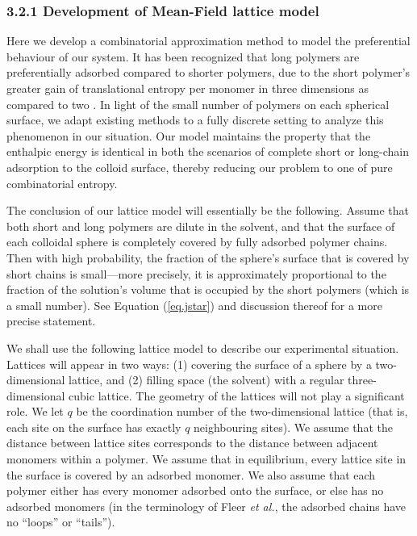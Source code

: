 \documentclass[journal=mamobx,manuscript=article]{achemso}
\begin{document}
\subsubsection{3.2.1 Development of Mean-Field lattice model}

Here we develop a combinatorial approximation method %
to model the preferential behaviour of our system.
It has been recognized that long polymers are
preferentially adsorbed compared to shorter polymers,
due to the short polymer's greater gain of
translational entropy per monomer in three dimensions
as compared to two 
\cite{Fleer1993}.  
In light of the small number of polymers on each
spherical surface, we adapt existing methods to a
fully discrete setting to analyze this phenomenon in our
situation.  Our model maintains the property that the enthalpic energy is identical in both the scenarios of complete short or long-chain adsorption to the colloid surface, thereby reducing our problem
to one of pure combinatorial entropy. 

The conclusion of our lattice model will essentially
be the following. 
Assume that both short and long polymers 
are dilute in the solvent, and that the 
surface of each colloidal sphere is completely covered 
by fully adsorbed polymer chains.  Then with high probability, 
the fraction of the sphere's surface that is 
covered by short chains is small---more precisely, it 
is approximately proportional
to the fraction of the solution's volume that is
occupied by the short polymers (which is a small
number).  See  Equation (\ref{eq.jstar}) and discussion thereof for a more precise statement.


We shall use the following lattice model to describe our experimental situation.  
Lattices will appear in two ways:  (1) covering the surface of a sphere by a two-dimensional lattice, and
(2) filling space (the solvent) with a regular three-dimensional cubic lattice.  
The geometry of the lattices will not play a significant role.  
We let $q$ be the coordination number of the two-dimensional lattice 
(that is, each site on the surface has exactly $q$ neighbouring sites).  We assume that 
the distance between lattice sites corresponds to the distance between adjacent monomers within a polymer.  
We assume that in equilibrium, every lattice site in the surface is covered by an adsorbed monomer.
We also assume that each polymer either has every monomer adsorbed onto the surface, or else has no adsorbed monomers (in the terminology of Fleer \textit{et al.}\cite{Fleer1993}, the adsorbed chains
have no ``loops'' or ``tails'').
\end{document}
